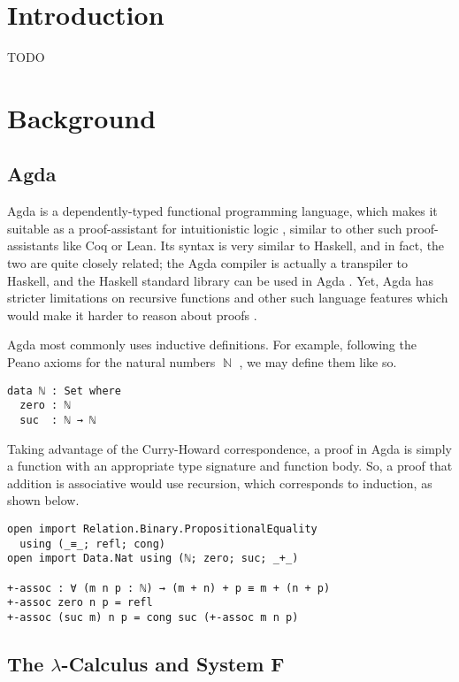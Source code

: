 \documentclass[logo,bsc,singlespacing,parskip,online]{infthesis}
\DeclareMathOperator{\nat}{\mathbb{N}}
\begin{document}
\chapter{Introduction}

TODO

\chapter{Background}

\section{Agda}
Agda is a dependently-typed functional programming language, which makes it
suitable as a proof-assistant for intuitionistic logic
\citep{norell_towards_2007}, similar to other such proof-assistants like Coq or
Lean. Its syntax is very similar to Haskell, and in fact, the two are quite
closely related; the Agda compiler is actually a transpiler to Haskell, and the
Haskell standard library can be used in Agda \citep{kusee_compiling_2017}. Yet,
Agda has stricter limitations on recursive functions and other such language
features which would make it harder to reason about proofs
\citep{berghofer_brief_2009}.

Agda most commonly uses inductive definitions. For example, following the Peano
axioms for the natural numbers $\nat$ \citep{boolos_freges_1995}, we may define
them like so.

\begin{verbatim}
data ℕ : Set where
  zero : ℕ
  suc  : ℕ → ℕ
\end{verbatim}

Taking advantage of the Curry-Howard correspondence, a proof in Agda is simply a
function with an appropriate type signature and function body. So, a proof that
addition is associative would use recursion, which corresponds to induction, as
shown below.

\begin{verbatim}
open import Relation.Binary.PropositionalEquality
  using (_≡_; refl; cong)
open import Data.Nat using (ℕ; zero; suc; _+_)

+-assoc : ∀ (m n p : ℕ) → (m + n) + p ≡ m + (n + p)
+-assoc zero n p = refl
+-assoc (suc m) n p = cong suc (+-assoc m n p)
\end{verbatim}

\section{The $\lambda$-Calculus and System F}
\end{document}
